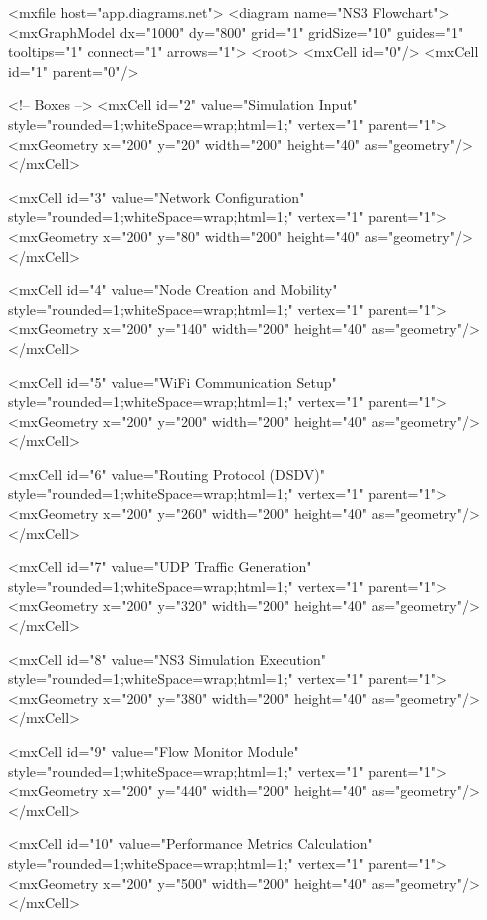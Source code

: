 <mxfile host="app.diagrams.net">
  <diagram name="NS3 Flowchart">
    <mxGraphModel dx="1000" dy="800" grid="1" gridSize="10" guides="1" tooltips="1" connect="1" arrows="1">
      <root>
        <mxCell id="0"/>
        <mxCell id="1" parent="0"/>

        <!-- Boxes -->
        <mxCell id="2" value="Simulation Input" style="rounded=1;whiteSpace=wrap;html=1;" vertex="1" parent="1">
          <mxGeometry x="200" y="20" width="200" height="40" as="geometry"/>
        </mxCell>

        <mxCell id="3" value="Network Configuration" style="rounded=1;whiteSpace=wrap;html=1;" vertex="1" parent="1">
          <mxGeometry x="200" y="80" width="200" height="40" as="geometry"/>
        </mxCell>

        <mxCell id="4" value="Node Creation and Mobility" style="rounded=1;whiteSpace=wrap;html=1;" vertex="1" parent="1">
          <mxGeometry x="200" y="140" width="200" height="40" as="geometry"/>
        </mxCell>

        <mxCell id="5" value="WiFi Communication Setup" style="rounded=1;whiteSpace=wrap;html=1;" vertex="1" parent="1">
          <mxGeometry x="200" y="200" width="200" height="40" as="geometry"/>
        </mxCell>

        <mxCell id="6" value="Routing Protocol (DSDV)" style="rounded=1;whiteSpace=wrap;html=1;" vertex="1" parent="1">
          <mxGeometry x="200" y="260" width="200" height="40" as="geometry"/>
        </mxCell>

        <mxCell id="7" value="UDP Traffic Generation" style="rounded=1;whiteSpace=wrap;html=1;" vertex="1" parent="1">
          <mxGeometry x="200" y="320" width="200" height="40" as="geometry"/>
        </mxCell>

        <mxCell id="8" value="NS3 Simulation Execution" style="rounded=1;whiteSpace=wrap;html=1;" vertex="1" parent="1">
          <mxGeometry x="200" y="380" width="200" height="40" as="geometry"/>
        </mxCell>

        <mxCell id="9" value="Flow Monitor Module" style="rounded=1;whiteSpace=wrap;html=1;" vertex="1" parent="1">
          <mxGeometry x="200" y="440" width="200" height="40" as="geometry"/>
        </mxCell>

        <mxCell id="10" value="Performance Metrics Calculation" style="rounded=1;whiteSpace=wrap;html=1;" vertex="1" parent="1">
          <mxGeometry x="200" y="500" width="200" height="40" as="geometry"/>
        </mxCell>

